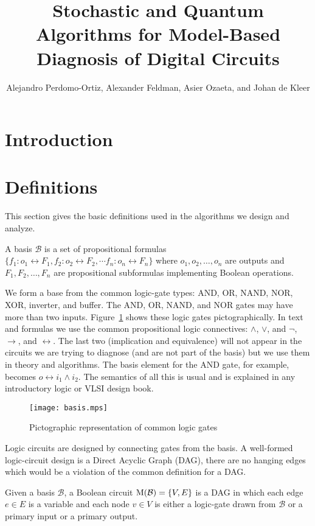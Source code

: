 \documentclass{article}
\title{Stochastic and Quantum Algorithms for Model-Based Diagnosis of Digital Circuits}
\author{Alejandro Perdomo-Ortiz, Alexander Feldman, Asier Ozaeta, and Johan de Kleer}
\begin{document}
\maketitle
\section{Introduction}

\section{Definitions}
%
This section gives the basic definitions used in the algorithms we
design and analyze.
%
\begin{definition}[Basis]
  A basis $\mathcal{B}$ is a set of propositional formulas $\{f_1 :
  o_1 \leftrightarrow F_1, f_2 : o_2 \leftrightarrow F_2, \cdots f_n :
  o_n \leftrightarrow F_n\}$ where $o_1, o_2, \ldots, o_n$ are outputs
  and $F_1, F_2, \ldots, F_n$ are propositional subformulas
  implementing Boolean operations.
\end{definition}
\noindent
%
We form a base from the common logic-gate types: AND, OR, NAND, NOR,
XOR, inverter, and buffer. The AND, OR, NAND, and NOR gates may have
more than two inputs. Figure~\ref{fig:basis} shows these logic gates
pictographically. In text and formulas we use the common propositional
logic connectives: $\wedge$, $\vee$, and $\neg$, $\rightarrow$, and
$\leftrightarrow$. The last two (implication and equivalence) will not
appear in the circuits we are trying to diagnose (and are not part of
the basis) but we use them in theory and algorithms. The basis element
for the AND gate, for example, becomes $o \leftrightarrow i_1 \wedge
i_2$. The semantics of all this is usual and is explained in any
introductory logic or VLSI design book.
%
\begin{figure}[htb]
\centering
\texttt{[image: basis.mps]}
\caption{Pictographic representation of common logic gates\label{fig:basis}}
\end{figure}
\par
%
Logic circuits are designed by connecting gates from the basis. A
well-formed logic-circuit design is a Direct Acyclic Graph (DAG),
there are no hanging edges which would be a violation of the common
definition for a DAG.
%
\begin{definition}
  Given a basis $\mathcal{B}$, a Boolean circuit $\mathrm{M}(\mathcal{B})
  = \{V, E\}$ is a DAG in which each edge $e \in E$ is a variable and
  each node $v \in V$ is either a logic-gate drawn from $\mathcal{B}$
  or a primary input or a primary output.
\end{definition}
\end{document}
